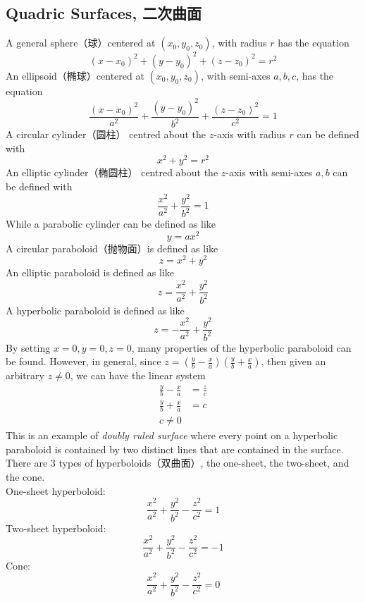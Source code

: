 \subsection{Quadric Surfaces, 二次曲面}
A general sphere（球）centered at $(x_0, y_0, z_0)$, with radius $r$ has the equation
$$(x-x_0)^2 + (y-y_0)^2 + (z-z_0)^2 = r^2$$
An ellipsoid（椭球）centered at $(x_0, y_0, z_0)$, with semi-axes $a, b, c$, has the equation
$$\frac{(x-x_0)^2}{a^2} + \frac{(y-y_0)^2}{b^2} + \frac{(z-z_0)^2}{c^2} = 1$$
A circular cylinder（圆柱） centred about the $z$-axis with radius $r$ can be defined with 
$$x^2 + y^2 = r^2$$
An elliptic cylinder（椭圆柱） centred about the $z$-axis with semi-axes $a, b$ can be defined with
$$\frac{x^2}{a^2} + \frac{y^2}{b^2} = 1$$
While a parabolic cylinder can be defined as like
$$y = ax^2$$
A circular paraboloid（抛物面）is defined as like
$$z = x^2 + y^2$$
An elliptic paraboloid is defined as like
$$z = \frac{x^2}{a^2} + \frac{y^2}{b^2}$$
A hyperbolic paraboloid is defined as like
$$z = -\frac{x^2}{a^2} + \frac{y^2}{b^2}$$
By setting $x = 0, y = 0, z = 0$, many properties of the hyperbolic paraboloid can be found. However, in general, since $z = (\frac{y}{b} - \frac{x}{a})(\frac{y}{b} + \frac{x}{a})$, then given an arbitrary $z \ne 0$, we can have the linear system
\begin{align*}
    \frac{y}{b} - \frac{x}{a} &= \frac{z}{c} \\
    \frac{y}{b} + \frac{x}{a} &= c \\
    c \ne 0
\end{align*}
This is an example of \textit{doubly ruled surface} where every point on a hyperbolic paraboloid is contained by two distinct lines that are contained in the surface. \\
There are $3$ types of hyperboloids（双曲面）, the one-sheet, the two-sheet, and the cone. \\
One-sheet hyperboloid:
$$\frac{x^2}{a^2} + \frac{y^2}{b^2} - \frac{z^2}{c^2} = 1$$
Two-sheet hyperboloid:
$$\frac{x^2}{a^2} + \frac{y^2}{b^2} - \frac{z^2}{c^2} = -1$$
Cone:
$$\frac{x^2}{a^2} + \frac{y^2}{b^2} - \frac{z^2}{c^2} = 0$$
\newpage